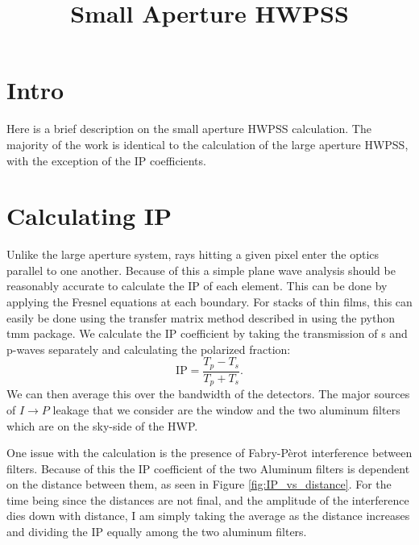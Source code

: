 \documentclass{article}
\title{Small Aperture HWPSS}
\author{}
\date{}
\theoremstyle{remark}
\newcommand{\ip}{$I\rightarrow P$ }
\begin{document}
\maketitle

\section{Intro}
Here is a brief description on the small aperture HWPSS calculation. 
The majority of the work is identical to the calculation of the large aperture HWPSS, with the exception of the IP coefficients.

\section{Calculating IP}
Unlike the large aperture system, rays hitting a given pixel enter the optics parallel to one another. 
Because of this a simple plane wave analysis should be reasonably accurate to calculate the IP of each element. 
This can be done by applying the Fresnel equations at each boundary.
For stacks of thin films, this can easily be done using the transfer matrix method described in \cite{} using the python tmm package. 
We calculate the IP coefficient by taking the transmission of s and p-waves separately and calculating the polarized fraction:
\[\text{IP} = \frac{T_p - T_s}{T_p + T_s}.\]
We can then average this over the bandwidth of the detectors.
The major sources of \ip leakage that we consider are the window and the two aluminum filters which are on the sky-side of the HWP.

One issue with the calculation is the presence of Fabry-P\`{e}rot interference between filters.
Because of this the IP coefficient of the two Aluminum filters is dependent on the distance between them, as seen in Figure \ref{fig:IP_vs_distance}.
For the time being since the distances are not final, and the amplitude of the interference dies down with distance, I am simply taking the average as the distance increases and 
dividing the IP equally among the two aluminum filters.
\end{document}
